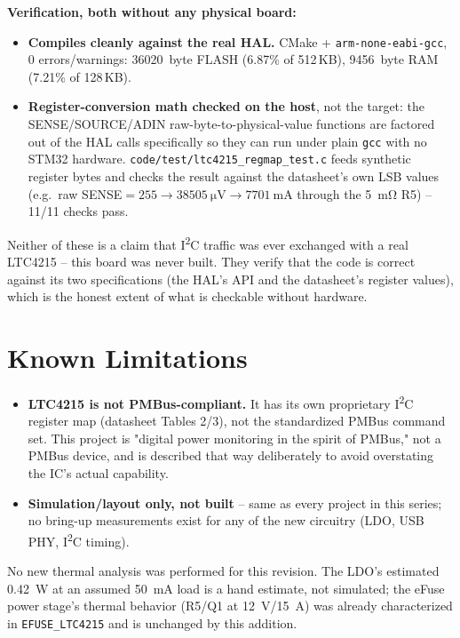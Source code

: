 \documentclass[11pt]{article}
\begin{document}
\textbf{Verification, both without any physical board:}
\begin{itemize}
\item \textbf{Compiles cleanly against the real HAL.} CMake + \texttt{arm-none-eabi-gcc}, 0
  errors/warnings: \SI{36020}{byte} FLASH (6.87\% of 512\,KB), \SI{9456}{byte} RAM (7.21\% of 128\,KB).
\item \textbf{Register-conversion math checked on the host}, not the target: the SENSE/SOURCE/ADIN
  raw-byte-to-physical-value functions are factored out of the HAL calls specifically so they can run
  under plain \texttt{gcc} with no STM32 hardware. \texttt{code/test/ltc4215\_regmap\_test.c} feeds
  synthetic register bytes and checks the result against the datasheet's own LSB values (e.g.\ raw
  SENSE$=255 \to \SI{38505}{\micro\volt} \to \SI{7701}{\milli\ampere}$ through the \SI{5}{\milli\ohm}
  R5) -- 11/11 checks pass.
\end{itemize}

Neither of these is a claim that I\textsuperscript{2}C traffic was ever exchanged with a real LTC4215
-- this board was never built. They verify that the code is correct against its two specifications (the
HAL's API and the datasheet's register values), which is the honest extent of what is checkable without
hardware.

\section{Known Limitations}

\begin{itemize}
\item \textbf{LTC4215 is not PMBus-compliant.} It has its own proprietary I\textsuperscript{2}C
  register map (datasheet Tables 2/3), not the standardized PMBus command set. This project is
  "digital power monitoring in the spirit of PMBus," not a PMBus device, and is described that way
  deliberately to avoid overstating the IC's actual capability.
\item \textbf{Simulation/layout only, not built} -- same as every project in this series; no bring-up
  measurements exist for any of the new circuitry (LDO, USB PHY, I\textsuperscript{2}C timing).
\end{itemize}
\label{sec:scope-thermal}
No new thermal analysis was performed for this revision. The LDO's estimated \SI{0.42}{\watt} at an
assumed \SI{50}{\milli\ampere} load is a hand estimate, not simulated; the eFuse power stage's
thermal behavior (R5/Q1 at \SI{12}{\volt}/\SI{15}{\ampere}) was already characterized in
\texttt{EFUSE\_LTC4215} and is unchanged by this addition.
\end{document}
